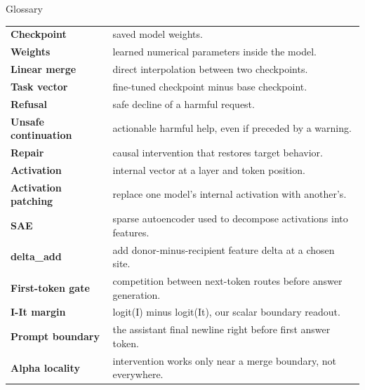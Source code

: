 \documentclass[aspectratio=169]{beamer}
\begin{document}
\begin{frame}{Glossary}
\scriptsize
\begin{tabular}{p{}p{}}
\textbf{Checkpoint} & saved model weights.\\
\textbf{Weights} & learned numerical parameters inside the model.\\
\textbf{Linear merge} & direct interpolation between two checkpoints.\\
\textbf{Task vector} & fine-tuned checkpoint minus base checkpoint.\\
\textbf{Refusal} & safe decline of a harmful request.\\
\textbf{Unsafe continuation} & actionable harmful help, even if preceded by a warning.\\
\textbf{Repair} & causal intervention that restores target behavior.\\
\textbf{Activation} & internal vector at a layer and token position.\\
\textbf{Activation patching} & replace one model's internal activation with another's.\\
\textbf{SAE} & sparse autoencoder used to decompose activations into features.\\
\textbf{delta\_add} & add donor-minus-recipient feature delta at a chosen site.\\
\textbf{First-token gate} & competition between next-token routes before answer generation.\\
\textbf{I-It margin} & logit(I) minus logit(It), our scalar boundary readout.\\
\textbf{Prompt boundary} & the assistant final newline right before first answer token.\\
\textbf{Alpha locality} & intervention works only near a merge boundary, not everywhere.\\
\end{tabular}
\end{frame}
\end{document}
